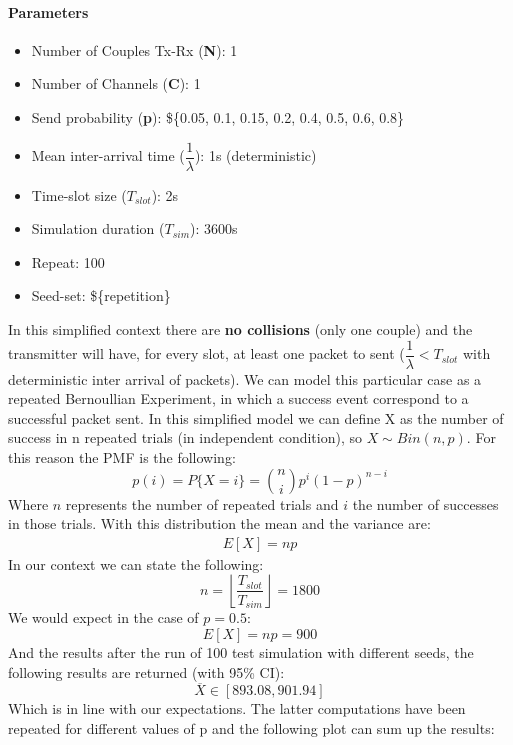 \paragraph{Parameters}
\begin{itemize}
	\item Number of Couples Tx-Rx (\textbf{N}): 1
	\item Number of Channels (\textbf{C}): 1
	\item Send probability (\textbf{p}): \$\{0.05, 0.1, 0.15, 0.2, 0.4, 0.5, 0.6, 0.8\}
	\item Mean inter-arrival time ($\dfrac{1}{\lambda}$): 1s (deterministic)
	\item Time-slot size ($T_{slot}$): 2s 
	\item Simulation duration ($T_{sim}$): 3600s
	\item Repeat: 100
	\item Seed-set: \$\{repetition\}
\end{itemize}
In this simplified context there are \textbf{no collisions} (only one couple) and the transmitter will have, for every slot, at least one packet to sent ($\dfrac{1}{\lambda} < T_{slot}$ with deterministic inter arrival of packets). We can model this particular case as a repeated Bernoullian Experiment, in which a success event correspond to a successful packet sent. In this simplified model we can define X as the number of success in n repeated trials (in independent condition), so $X \sim Bin(n, p)$. For this reason the PMF is the following:
\begin{equation}
	p(i) = P\{X = i\} = \binom{n}{i} p^{i} (1-p)^{n-i}
\end{equation}
Where $n$ represents the number of repeated trials and $i$ the number of successes in those trials. With this distribution the mean and the variance are:
\begin{align*}
	E[X] = np 
\end{align*}
In our context we can state the following:
\begin{equation}
	n = \left \lfloor{\dfrac{T_{slot}}{T_{sim}}}\right \rfloor = 1800
\end{equation}
We would expect in the case of $p = 0.5$:
\begin{equation}
	E[X] = np = 900
\end{equation}
And the results after the run of 100 test simulation with different seeds, the following results are returned (with 95\% CI):
\begin{equation}
	\overline{X} \in [893.08, 901.94]
\end{equation}
Which is in line with our expectations. The latter computations have been repeated for different values of p and the following plot can sum up the results:

